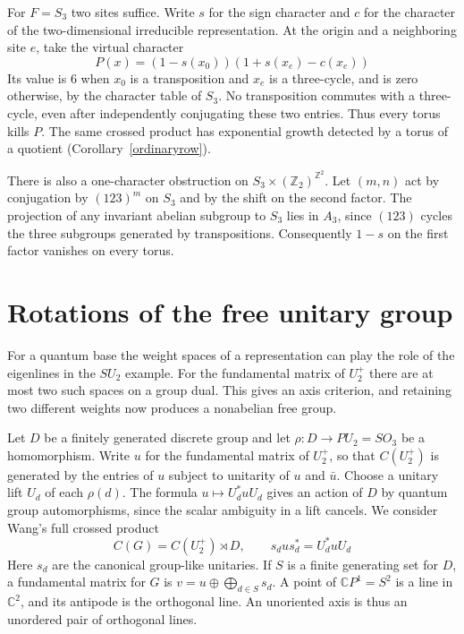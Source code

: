 \documentclass[11pt,a4paper]{article}
\theoremstyle{remark}
\begin{document}
For $F=S_3$ two sites suffice. Write $s$ for the sign character and
$c$ for the character of the two-dimensional irreducible representation.
At the origin and a neighboring site $e$, take the virtual character
\[
 P(x)=(1-s(x_0))(1+s(x_e)-c(x_e))
\]
Its value is $6$ when $x_0$ is a transposition and $x_e$ is a three-cycle,
and is zero otherwise, by the character table of $S_3$. No transposition
commutes with a three-cycle, even after independently conjugating these
two entries. Thus every torus kills $P$. The same crossed product has
exponential growth detected by a torus of a quotient
(Corollary~\ref{ordinaryrow}).

There is also a one-character obstruction on $S_3\times (\mathbb Z_2)^{\mathbb Z^2}$.
Let $(m,n)$ act by conjugation by $(123)^m$ on $S_3$ and by the shift
on the second factor. The projection of any invariant abelian subgroup
to $S_3$ lies in $A_3$, since $(123)$ cycles the three subgroups generated
by transpositions. Consequently $1-s$ on the first factor vanishes on
every torus.

\section{Rotations of the free unitary group}\label{secaxis}

For a quantum base the weight spaces of a representation can play
the role of the eigenlines in the $SU_2$ example. For the fundamental
matrix of $U_2^+$ there are at most two such spaces on a group dual.
This gives an axis criterion, and retaining two different weights now
produces a nonabelian free group.

Let $D$ be a finitely generated discrete group and let
$\rho:D\to PU_2=SO_3$ be a homomorphism. Write $u$ for the fundamental
matrix of $U_2^+$, so that $C(U_2^+)$ is generated by the entries of $u$
subject to unitarity of $u$ and $\bar u$. Choose a unitary lift $U_d$ of
each $\rho(d)$. The formula $u\mapsto U_d^*uU_d$ gives an action of $D$ by
quantum group automorphisms, since the scalar ambiguity in a lift cancels.
We consider Wang's full crossed product \cite{wang}
\[
 C(G)= C(U_2^+)\rtimes D,\qquad s_d u s_d^*=U_d^*uU_d
\]
Here $s_d$ are the canonical group-like unitaries. If $S$ is a finite
generating set for $D$, a fundamental matrix for $G$ is
$v=u\oplus\bigoplus_{d\in S}s_d$. A point of $\mathbb CP^1=S^2$ is a line
in $\mathbb C^2$, and its antipode is the orthogonal line. An unoriented
axis is thus an unordered pair of orthogonal lines.
\end{document}
